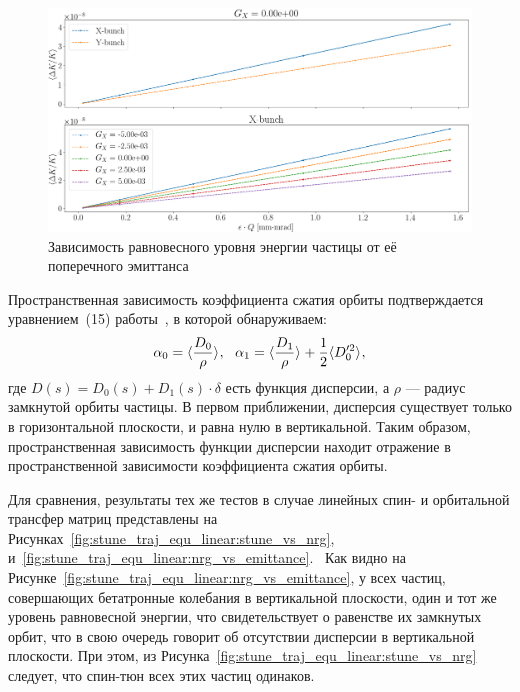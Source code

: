 \begin{figure}[H]
	\centering
	\includegraphics[height=.3\paperheight]{images/stune_traj_equ/part1/equ_energy_vs_emittance}
	\caption{Зависимость равновесного уровня энергии частицы от её поперечного эмиттанса\label{fig:equ_nrg_vs_emittance}}
\end{figure}

Пространственная зависимость коэффициента сжатия орбиты подтверждается уравнением~(15) работы~\cite{Senichev:IPAC13}, в которой обнаруживаем:
\[
\alpha_0 = \avg{\frac{D_0}{\rho}},~~ \alpha_1 = \avg{\frac{D_1}{\rho}} + \frac12\avg{D_0'^2},
\]
где $D(s) = D_0(s) + D_1(s)\cdot \delta$  есть функция дисперсии, а $\rho$ --- радиус замкнутой орбиты частицы.
В первом приближении, дисперсия существует только в горизонтальной плоскости, и равна нулю в вертикальной. Таким образом, пространственная зависимость функции дисперсии находит отражение в пространственной зависимости коэффициента сжатия орбиты.

Для сравнения, результаты тех же тестов в случае линейных спин- и орбитальной трансфер матриц представлены на Рисунках~\ref{fig:stune_traj_equ_linear:stune_vs_nrg}, и~\ref{fig:stune_traj_equ_linear:nrg_vs_emittance}.  Как видно на Рисунке~\ref{fig:stune_traj_equ_linear:nrg_vs_emittance}, у всех частиц, совершающих бетатронные колебания в вертикальной плоскости, один и тот же уровень равновесной энергии, что свидетельствует о равенстве их замкнутых орбит, что в свою очередь говорит об отсутствии дисперсии в вертикальной плоскости. При этом, из Рисунка~\ref{fig:stune_traj_equ_linear:stune_vs_nrg} следует, что спин-тюн всех этих частиц одинаков.


